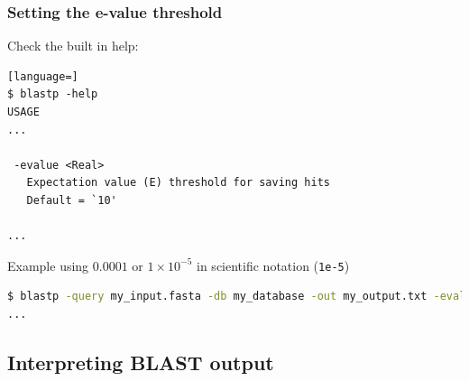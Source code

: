 \documentclass[table]{beamer}
\begin{document}
\begin{frame}[fragile]
\frametitle{Setting the e-value threshold}

Check the built in help:
\begin{lstlisting}[language=]
$ blastp -help
USAGE
...

 -evalue <Real>
   Expectation value (E) threshold for saving hits
   Default = `10'

...
\end{lstlisting}

Example using $0.0001$ or $1 \times 10^{-5}$ in scientific notation (\texttt{1e-5})
\begin{lstlisting}[language=sh]
$ blastp -query my_input.fasta -db my_database -out my_output.txt -evalue 1e-5
...
\end{lstlisting}
\end{frame}
     
    \subsection{Interpreting BLAST output}
    \begin{frame}
     \frametitle{}
    \end{frame}
    
\end{document}
